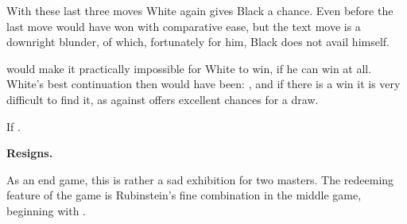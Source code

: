 \documentclass[10pt,twoside]{article}
\begin{document}
\label{bd5}

With these last three moves White again gives Black a chance. Even before the last move
 would have won with comparative ease, but the text move is a downright blunder, of
which, fortunately for him, Black does not avail himself.

\board


 would make it practically impossible for White to win, if he can win at all.
White's best continuation then would have been:
, and if there is a win it
is very difficult to find it, as against  offers excellent chances for a
draw.


If .


\noindent\textbf{Resigns.}

As an end game, this is rather a sad exhibition for two masters. The redeeming feature of the game
is Rubinstein's fine combination in the middle game, beginning with .
\end{document}
